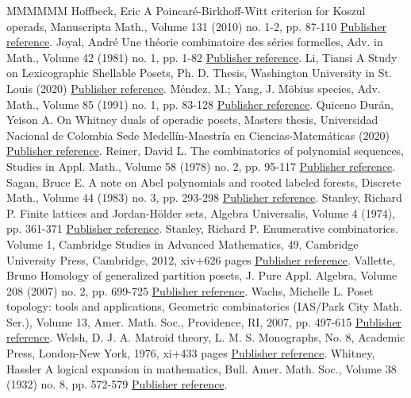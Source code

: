 \documentclass[11pt]{article}
\theoremstyle{definition}
\numberwithin{equation}{section}
\begin{document}
\begin{thebibliography}{MMMMMM}
 Hoffbeck, Eric A Poincaré-Birkhoff-Witt criterion for Koszul operads, Manuscripta Math., Volume 131 (2010) no. 1-2, pp. 87-110 \href{https://alco.centre-mersenne.org/articles/10.5802/alco.455/#Hoffbeck2010}{Publisher reference}.
 Joyal, André Une théorie combinatoire des séries formelles, Adv. in Math., Volume 42 (1981) no. 1, pp. 1-82 \href{https://alco.centre-mersenne.org/articles/10.5802/alco.455/#Joyal1981}{Publisher reference}.
 Li, Tiansi A Study on Lexicographic Shellable Posets, Ph. D. Thesis, Washington University in St. Louis (2020) \href{https://alco.centre-mersenne.org/articles/10.5802/alco.455/#Tiansi2020}{Publisher reference}.
 Méndez, M.; Yang, J. Möbius species, Adv. Math., Volume 85 (1991) no. 1, pp. 83-128 \href{https://alco.centre-mersenne.org/articles/10.5802/alco.455/#MendezYang1991}{Publisher reference}.
 Quiceno Durán, Yeison A. On Whitney duals of operadic posets, Masters thesis, Universidad Nacional de Colombia Sede Medellín-Maestría en Ciencias-Matemáticas (2020) \href{https://alco.centre-mersenne.org/articles/10.5802/alco.455/#QuicenoDuran2020}{Publisher reference}.
 Reiner, David L. The combinatorics of polynomial sequences, Studies in Appl. Math., Volume 58 (1978) no. 2, pp. 95-117 \href{https://alco.centre-mersenne.org/articles/10.5802/alco.455/#Reiner1978}{Publisher reference}.
 Sagan, Bruce E. A note on Abel polynomials and rooted labeled forests, Discrete Math., Volume 44 (1983) no. 3, pp. 293-298 \href{https://alco.centre-mersenne.org/articles/10.5802/alco.455/#Sagan1983}{Publisher reference}.
 Stanley, Richard P. Finite lattices and Jordan-Hölder sets, Algebra Universalis, Volume 4 (1974), pp. 361-371 \href{https://alco.centre-mersenne.org/articles/10.5802/alco.455/#Stanley1974}{Publisher reference}.
 Stanley, Richard P. Enumerative combinatorics. Volume 1, Cambridge Studies in Advanced Mathematics, 49, Cambridge University Press, Cambridge, 2012, xiv+626 pages \href{https://alco.centre-mersenne.org/articles/10.5802/alco.455/#Stanley2012}{Publisher reference}.
 Vallette, Bruno Homology of generalized partition posets, J. Pure Appl. Algebra, Volume 208 (2007) no. 2, pp. 699-725 \href{https://alco.centre-mersenne.org/articles/10.5802/alco.455/#Vallette2007}{Publisher reference}.
 Wachs, Michelle L. Poset topology: tools and applications, Geometric combinatorics (IAS/Park City Math. Ser.), Volume 13, Amer. Math. Soc., Providence, RI, 2007, pp. 497-615 \href{https://alco.centre-mersenne.org/articles/10.5802/alco.455/#Wachs2007}{Publisher reference}.
 Welsh, D. J. A. Matroid theory, L. M. S. Monographs, No. 8, Academic Press, London-New York, 1976, xi+433 pages \href{https://alco.centre-mersenne.org/articles/10.5802/alco.455/#Welsh1976}{Publisher reference}.
 Whitney, Hassler A logical expansion in mathematics, Bull. Amer. Math. Soc., Volume 38 (1932) no. 8, pp. 572-579 \href{https://alco.centre-mersenne.org/articles/10.5802/alco.455/#Whitney1932}{Publisher reference}.
\end{thebibliography}
\end{document}
